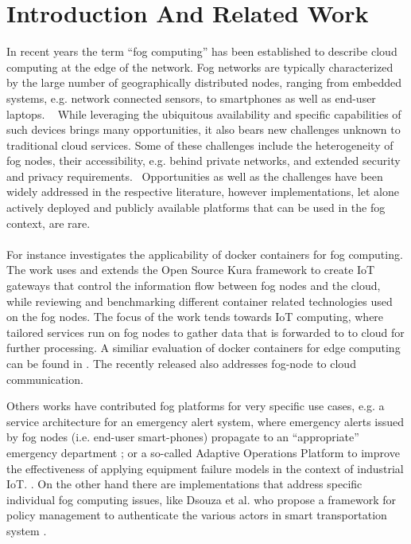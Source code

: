 \section{Introduction And Related Work}

In recent years the term ``fog computing'' has been established to describe
cloud computing at the edge of the network. Fog networks are typically
characterized by the large number of geographically distributed nodes, ranging
from embedded systems, e.g. network connected
sensors, to smartphones as well as end-user laptops.
~\cite{Bonomi:2012:FCR:2342509.2342513,Yi:2015:SFC:2757384.2757397}
While leveraging the
ubiquitous availability and specific capabilities of such devices brings
many opportunities, it also bears new challenges unknown to traditional cloud
services. Some of these challenges include the heterogeneity of fog nodes,
their accessibility, e.g. behind private networks, and extended security and
privacy requirements.~\cite{botta_integration_2016}
Opportunities as well as the challenges have been widely addressed in the
respective literature, however implementations, let alone actively deployed and
publicly available platforms that can be used in the fog context, are rare. \\ \\

For instance \cite{bellavista_feasibility_2017} investigates the applicability of
docker containers for fog computing. The work uses and extends the Open Source Kura
framework to create IoT gateways that control the information
flow between fog nodes and the cloud, while reviewing and benchmarking different
container related technologies used on the fog nodes.
The focus of the work tends towards IoT computing, where tailored services run
on fog nodes to gather data that is forwarded to to cloud for further processing.
A similiar evaluation of docker containers for edge computing can be found in
\cite{ismail_evaluation_2015}.
The recently released  also addresses fog-node to cloud
communication.

Others works have contributed fog platforms for very specific use cases, e.g.
a service architecture for an emergency alert system, where emergency alerts
issued by fog nodes (i.e. end-user smart-phones) propagate to an ``appropriate''
emergency department \cite{7134091}; or a so-called Adaptive Operations Platform
to improve the effectiveness of applying equipment failure models in the context
of industrial IoT. \cite{gazis_components_2015}.
On the other hand there are implementations that address specific individual
fog computing issues, like Dsouza et al. who propose a framework for
policy management to authenticate the various actors in smart transportation
system \cite{dsouza_policy-driven_2014}.

